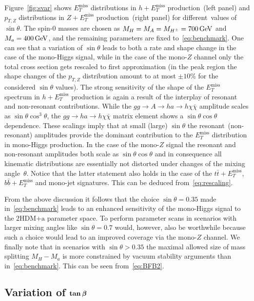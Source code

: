 \documentclass[a4paper, 11pt,notoc]{article}
\newcommand{\MET}{\ensuremath{E_T^\mathrm{miss}}\xspace}
\newcommand{\mA}{\ensuremath{M_{A}}\xspace}
\newcommand{\ma}{\ensuremath{M_{a}}\xspace}
\newcommand{\mH}{\ensuremath{M_{H}}\xspace}
\newcommand{\mHc}{\ensuremath{M_{H^{\pm}}}\xspace}
\newcommand{\hdma}{\ensuremath{\textrm{2HDM+a}}\xspace}
\def\bm#1{\mbox{\boldmath$#1$\unboldmath}}
\begin{document}
Figure~\ref{fig:svar} shows $\MET$ distributions in $h + \MET$ production~(left panel) and $p_{T,Z}$ distributions in $Z+\MET$ production~(right panel) for different~values of $\sin \theta$. The spin-0 masses are chosen as $\mH = \mA = \mHc = 700 \, {\rm GeV}$ and $\ma = 400 \, {\rm GeV}$, and the remaining parameters are fixed to~\eqref{eq:benchmark}.   One can see that a variation of $\sin \theta$ leads to both a rate and shape change in the case of the mono-Higgs signal, while in the case of the mono-$Z$ channel only the total cross section gets rescaled to first approximation (in the peak region the shape changes of the $p_{T,Z}$ distribution amount to at most $\pm 10\%$ for the considered $\sin \theta$ values). The strong sensitivity of the shape of the $\MET$ spectrum in $h + \MET$ production is again a result of the interplay of resonant and non-resonant contributions. While the $gg \to A \to h a \to h \chi \bar \chi$  amplitude scales as $\sin \theta \cos^3 \theta$, the $gg \to h a  \to h \chi \bar \chi$ matrix element shows a $\sin \theta \cos \theta$ dependence. These scalings imply that at small (large) $\sin \theta$ the resonant~(non-resonant) amplitudes provide the dominant contribution to the $\MET$ distribution in mono-Higgs production.  In the case of the mono-$Z$ signal the resonant and non-resonant amplitudes both scale as $\sin \theta \cos \theta$ and in consequence  all kinematic distributions are essentially not distorted  under changes of the mixing angle~$\theta$. Notice that the latter statement also holds in the case of the $t \bar t +\MET$, $b \bar b + \MET$ and mono-jet signatures.  This can be deduced from~\eqref{eq:rescaling}. 

From the above discussion it follows that the choice $\sin \theta = 0.35$ made in~\eqref{eq:benchmark} leads to an enhanced sensitivity of the mono-Higgs signal to the \hdma parameter space. To perform parameter scans in scenarios with larger mixing angles like $\sin \theta = 0.7$ would, however, also be worthwhile because such a choice would lead to an improved coverage via the mono-$Z$ channel. We finally note that in scenarios with $\sin \theta >0.35$ the maximal allowed size of mass splitting $M_H - M_a$ is more constrained by vacuum stability arguments than in~\eqref{eq:benchmark}. This can be seen from~\eqref{eq:BFB2}. 

\subsection*{Variation of $\bm{\tan \beta}$}
\end{document}
